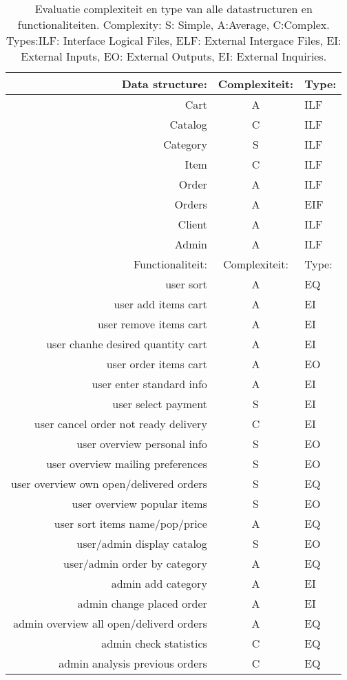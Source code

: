 \documentclass{article}
\begin{document}
\begin{table}
\begin{tabular}{|r|c|l|}
\hline
Data structure:	& Complexiteit:	& Type:	\\
\hline
Cart			& A 			& ILF 	\\
Catalog			& C 			& ILF 	\\
Category		& S 			& ILF	\\
Item			& C 			& ILF 	\\
Order			& A 			& ILF 	\\
Orders			& A 			& EIF 	\\
Client			& A 			& ILF 	\\
Admin			& A 			& ILF 	\\
\hline
\hline
Functionaliteit:							& Complexiteit:	& Type: \\
\hline
user sort									& A				& EQ	\\
user add items cart							& A				& EI	\\
user remove items cart						& A				& EI	\\
user chanhe desired quantity cart			& A				& EI	\\
user order items cart						& A				& EO	\\
user enter standard info					& A				& EI	\\
user select payment							& S				& EI	\\
user cancel order not ready delivery		& C				& EI	\\
user overview personal info					& S				& EO	\\
user overview mailing preferences			& S				& EO	\\
user overview own open/delivered orders		& S				& EQ	\\
user overview popular items					& S				& EO	\\
user sort items name/pop/price				& A				& EQ	\\
user/admin display catalog					& S				& EO	\\
user/admin order by category				& A				& EQ 	\\
admin add category							& A				& EI	\\
admin change placed order					& A				& EI	\\
admin overview all open/deliverd orders 	& A				& EQ	\\
admin check statistics						& C				& EQ	\\
admin analysis previous orders				& C				& EQ	\\
\hline
\end{tabular}
\caption{Evaluatie complexiteit en type van alle datastructuren en functionaliteiten. Complexity: S: Simple, A:Average, C:Complex. Types:ILF: Interface Logical Files, ELF: External Intergace Files, EI: External Inputs, EO: External Outputs, EI: External Inquiries.}
\label{eval}
\end{table}
\end{document}
